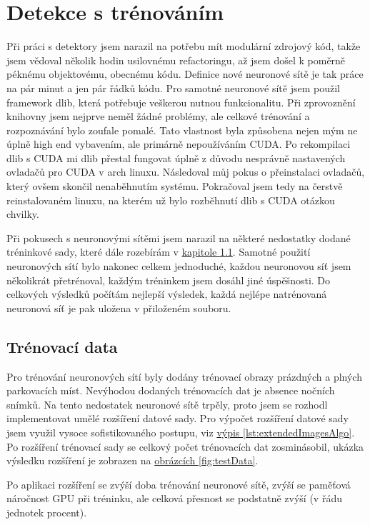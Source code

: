 \documentclass[10pt,a4paper, table]{article}
\begin{document}
\section{Detekce s trénováním}
Při práci s detektory jsem narazil na potřebu mít modulární zdrojový kód, takže jsem vědoval několik hodin usilovnému refactoringu, až jsem došel k poměrně péknému objektovému, obecnému kódu. Definice nové neuronové sítě je tak práce na pár minut a jen pár řádků kódu. Pro samotné neuronové sítě jsem použil framework dlib, která potřebuje veškerou nutnou funkcionalitu. Při zprovoznění knihovny jsem nejprve neměl žádné problémy, ale celkové trénování a rozpoznávání bylo zoufale pomalé. Tato vlastnost byla způsobena nejen mým ne úplně high end vybavením, ale primárně  nepoužíváním CUDA. Po rekompilaci dlib s CUDA mi dlib přestal fungovat úplně z důvodu nesprávně nastavených ovladačů pro CUDA v arch linuxu. Následoval můj pokus o přeinstalaci ovladačů, který ovšem skončil nenaběhnutím systému. Pokračoval jsem tedy na čerstvě reinstalovaném linuxu, na kterém už bylo rozběhnutí dlib s CUDA otázkou chvilky. \par
Při pokusech s neuronovými sítěmi jsem narazil na některé nedostatky dodané tréninkové sady, které dále rozebírám v \hyperref[sec:augment]{kapitole \ref{sec:augment}}. Samotné použití neuronových sítí bylo nakonec celkem jednoduché, každou neuronovou síť jsem několikrát přetrénoval, každým tréninkem jsem dosáhl jiné úspěšnosti. Do celkových výsledků počítám nejlepší výsledek, každá nejlépe natrénovaná neuronová síť je pak uložena v přiloženém souboru.

\subsection{Trénovací data}\label{sec:augment}
Pro trénování neuronových sítí byly dodány trénovací obrazy prázdných a plných parkovacích míst. Nevýhodou dodaných trénovacích dat je absence nočních snímků. Na tento nedostatek neuronové sítě trpěly, proto jsem se rozhodl implementovat umělé rozšíření datové sady. Pro výpočet rozšíření datové sady jsem využil vysoce sofistikovaného postupu, viz \hyperref[lst:extendedImagesAlgo]{výpis \ref{lst:extendedImagesAlgo}}. Po rozšíření trénovací sady se celkový počet trénovacích dat zosminásobil, ukázka výsledku rozšíření je zobrazen na \hyperref[fig:testData]{obrázcích \ref{fig:testData}}. \par
Po aplikaci rozšíření se zvýší doba trénování neuronové sítě, zvýší se paměťová náročnost GPU při tréninku, ale celková přesnost se podstatně zvýší (v řádu jednotek procent).
\end{document}
